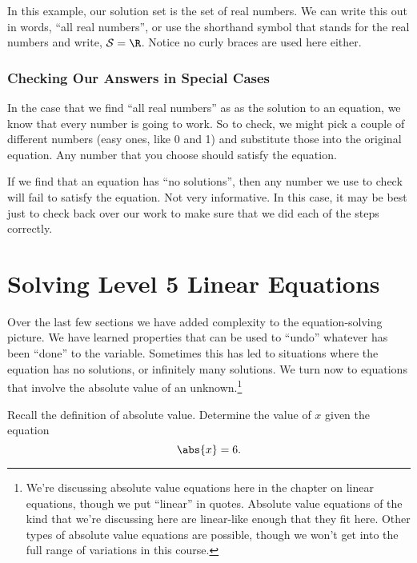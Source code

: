 In this example, our solution set is the set of real numbers. We can write this out in words, ``all real numbers'', or use the shorthand symbol that stands for the real numbers and write, $\mathcal{S} = \R$. Notice no curly braces are used here either.

\subsubsection{Checking Our Answers in Special Cases}

In the case that we find ``all real numbers'' as as the solution to an equation, we know that every number is going to work. So to check, we might pick a couple of different numbers (easy ones, like 0 and 1) and substitute those into the original equation. Any number that you choose should satisfy the equation.

If we find that an equation has ``no solutions'', then any number we use to check will fail to satisfy the equation. Not very informative. In this case, it may be best just to check back over our work to make sure that we did each of the steps correctly.

\section{Solving Level 5 Linear Equations}
\label{sec:linearlevel5}

Over the last few sections we have added complexity to the equation-solving picture. We have learned properties that can be used to ``undo'' whatever has been ``done'' to the variable. Sometimes this has led to situations where the equation has no solutions, or infinitely many solutions. We turn now to equations that involve the absolute value of an unknown.\footnote{We're discussing absolute value equations here in the chapter on linear equations, though we put ``linear'' in quotes. Absolute value equations of the kind that we're discussing here are linear-like enough that they fit here. Other types of absolute value equations are possible, though we won't get into the full range of variations in this course.}

\begin{boxedexplore}
\end{boxedexplore}

\begin{boxedexplore}
Recall the definition of absolute value. Determine the value of $x$ given the equation \[\abs{x} = 6.\]
\end{boxedexplore} %

